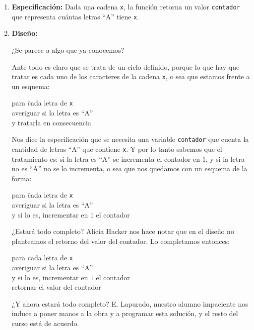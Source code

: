\begin{enumerate}

\item {\bf Especificación: } Dada una cadena \lstinline!x!, la función
retorna un valor  \lstinline!contador! que representa cuántas letras ``A''
tiene \lstinline!x!.

\item {\bf Diseño: }

¿Se parece a algo que ya conocemos?

Ante todo es claro que se trata de un ciclo definido, porque lo que hay que
tratar es cada uno de los caracteres de la cadena \lstinline!x!, o sea que
estamos frente a un esquema:

\begin{tabbing}
para \= cada letra de \lstinline+x+\\
\> averiguar si la letra es ``A''\\
\> y tratarla en consecuencia\\
\end{tabbing}

Nos dice la especificación que se necesita una variable
\lstinline!contador! que cuenta la cantidad de letras ``A'' que contiene
\lstinline!x!. Y por lo tanto sabemos que el tratamiento es: si la letra es
``A'' se incrementa el contador en $1$, y si la letra no es ``A'' no se lo
incrementa, o sea que nos quedamos con un esquema de la forma:

\begin{tabbing}
para \= cada letra de \lstinline+x+\\
\> averiguar si la letra es ``A'' \\
\> y si lo es, incrementar en $1$ el contador\\
\end{tabbing}

¿Estará todo completo? Alicia Hacker nos hace notar que en el diseño no
planteamos el retorno del valor del contador. Lo completamos entonces:

\begin{tabbing}
para \= cada letra de \verb+x+\\
\> averiguar si la letra es ``A'' \\
\> y si lo es, incrementar en $1$ el contador\\
retornar el valor del contador\\
\end{tabbing}

¿Y ahora estará todo completo? E. Lapurado, nuestro alumno impaciente nos
induce a poner manos a la obra y a programar esta solución, y el resto del
curso está de acuerdo.



\end{enumerate}
